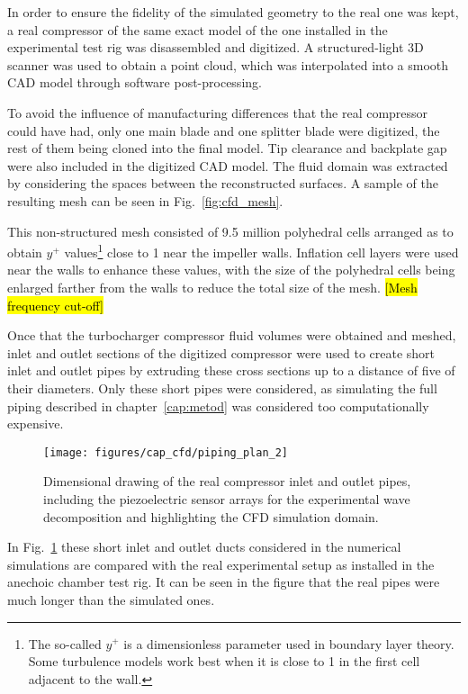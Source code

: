 In order to ensure the fidelity of the simulated geometry to the real one was kept, a real compressor of the same exact model of the one installed in the experimental test rig was disassembled and digitized. A structured-light 3D scanner was used to obtain a point cloud, which was interpolated into a smooth CAD model through software post-processing.

To avoid the influence of manufacturing differences that the real compressor could have had, only one main blade and one splitter blade were digitized, the rest of them being cloned into the final model. Tip clearance and backplate gap were also included in the digitized CAD model. The fluid domain was extracted by considering the spaces between the reconstructed surfaces. A sample of the resulting mesh can be seen in Fig.~\ref{fig:cfd_mesh}.

This non-structured mesh consisted of 9.5 million polyhedral cells arranged as to obtain $y^+$ values\footnote{The so-called $y^+$ is a dimensionless parameter used in boundary layer theory. Some turbulence models work best when it is close to 1 in the first cell adjacent to the wall.} close to 1 near the impeller walls. Inflation cell layers were used near the walls to enhance these values, with the size of the polyhedral cells being enlarged farther from the walls to reduce the total size of the mesh. \hl{[Mesh frequency cut-off]}

Once that the turbocharger compressor fluid volumes were obtained and meshed, inlet and outlet sections of the digitized compressor were used to create short inlet and outlet pipes by extruding these cross sections up to a distance of five of their diameters. Only these short pipes were considered, as simulating the full piping described in chapter~\ref{cap:metod} was considered too computationally expensive. 

\begin{figure}
\centering
\texttt{[image: figures/cap\_cfd/piping\_plan\_2]}
\caption{Dimensional drawing of the real compressor inlet and outlet pipes, including the piezoelectric sensor arrays for the experimental wave decomposition and highlighting the CFD simulation domain.}
\label{fig:cfd_piping_plan}
\end{figure}

In Fig.~\ref{fig:cfd_piping_plan} these short inlet and outlet ducts considered in the numerical simulations are compared with the real experimental setup as installed in the anechoic chamber test rig. It can be seen in the figure that the real pipes were much longer than the simulated ones. 

